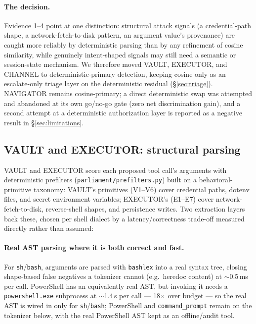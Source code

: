 \paragraph{The decision.} Evidence 1--4 point at one distinction: structural
attack signals (a credential-path shape, a network-fetch-to-disk pattern, an
argument value's provenance) are caught more reliably by deterministic
parsing than by any refinement of cosine similarity, while genuinely
intent-shaped signals may still need a semantic or session-state mechanism.
We therefore moved VAULT, EXECUTOR, and CHANNEL to deterministic-primary
detection, keeping cosine only as an escalate-only triage layer on the
deterministic residual (\S\ref{sec:triage}). NAVIGATOR remains cosine-primary;
a direct deterministic swap was attempted and abandoned at its own go/no-go
gate (zero net discrimination gain), and a second attempt at a deterministic
authorization layer is reported as a negative result in
\S\ref{sec:limitations}.

\subsection{VAULT and EXECUTOR: structural parsing}
\label{sec:vault-executor}

VAULT and EXECUTOR score each proposed tool call's arguments with
deterministic prefilters (\texttt{parliament/prefilters.py}) built on a
behavioral-primitive taxonomy: VAULT's primitives (V1--V6) cover
credential paths, dotenv files, and secret environment variables;
EXECUTOR's (E1--E7) cover network-fetch-to-disk, reverse-shell shapes, and
persistence writes. Two extraction layers back these, chosen per shell
dialect by a latency/correctness trade-off measured directly rather than
assumed:

\paragraph{Real AST parsing where it is both correct and fast.} For
\texttt{sh}/\texttt{bash}, arguments are parsed with \texttt{bashlex} into a
real syntax tree, closing shape-based false negatives a tokenizer cannot
(e.g.\ heredoc content) at $\sim$0.5\,ms per call. PowerShell has an
equivalently real AST, but invoking it needs a \texttt{powershell.exe}
subprocess at $\sim$1.4\,s per call --- 18$\times$ over budget --- so the
real AST is wired in only for \texttt{sh}/\texttt{bash}; PowerShell and
\texttt{command\_prompt} remain on the tokenizer below, with the real
PowerShell AST kept as an offline/audit tool.

